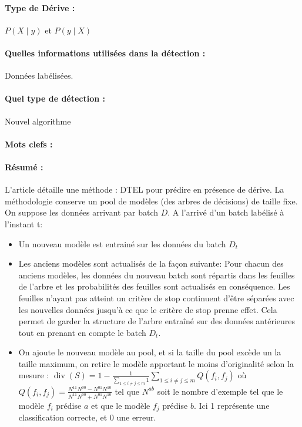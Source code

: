 \documentclass[11pt,a4paper]{report}
\begin{document}
\paragraph{Type de Dérive :} $P(X\mid y)$ et $P(y \mid X)$
\paragraph{Quelles informations utilisées dans la détection :} Données labélisées.
\paragraph{Quel type de détection :} Nouvel algorithme

\paragraph{Mots clefs :} 

\paragraph{Résumé :} L'article détaille une méthode : DTEL pour prédire en présence de dérive. La méthodologie conserve un pool de modèles (des arbres de décisions) de taille fixe. On suppose les données arrivant par batch $D$. 
A l'arrivé d'un batch labélisé à l'instant t: 
\begin{itemize}
	\item Un nouveau modèle est entrainé sur les données du batch $D_t$
	\item Les anciens modèles sont actualisés de la façon suivante: Pour chacun des anciens modèles, les données du nouveau batch sont répartis dans les feuilles de l'arbre et les probabilités des feuilles sont actualisés en conséquence. Les feuilles n'ayant pas atteint un critère de stop continuent d'être séparées avec les nouvelles données jusqu'à ce que le critère de stop prenne effet. Cela permet de garder la structure de l'arbre entraîné sur des données antérieures tout en prenant en compte le batch $D_t$.
	\item  On ajoute le nouveau modèle au pool, et si la taille du pool excède un la taille maximum, on retire le modèle apportant le moins d'originalité selon la mesure : $\operatorname{div}(S)=1-\frac{1}{\sum_{1 \leq i \neq j \leq m} 1} \sum_{1 \leq i \neq j \leq m} Q\left(f_{i}, f_{j}\right)$ où $Q\left(f_{i}, f_{j}\right)=\frac{N^{11} N^{00}-N^{01} N^{10}}{N^{11} N^{00}+N^{01} N^{10}}$ tel que $N^{ab}$ soit le nombre d'exemple tel que le modèle $f_i$ prédise $a$ et que le modèle $f_j$ prédise $b$. Ici 1 représente une classification correcte, et 0 une erreur.
\end{itemize}
\end{document}
